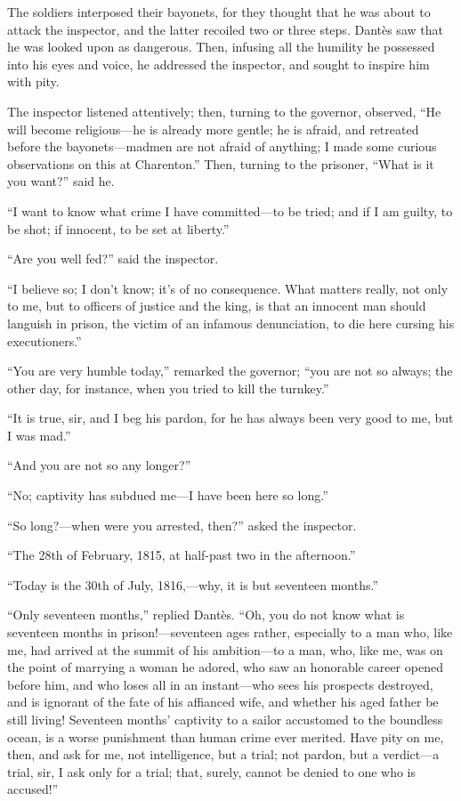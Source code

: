The soldiers interposed their bayonets, for they thought that he was
about to attack the inspector, and the latter recoiled two or three
steps. Dantès saw that he was looked upon as dangerous. Then, infusing
all the humility he possessed into his eyes and voice, he addressed the
inspector, and sought to inspire him with pity.

The inspector listened attentively; then, turning to the governor,
observed, “He will become religious—he is already more gentle; he is
afraid, and retreated before the bayonets—madmen are not afraid of
anything; I made some curious observations on this at Charenton.” Then,
turning to the prisoner, “What is it you want?” said he.

“I want to know what crime I have committed—to be tried; and if I am
guilty, to be shot; if innocent, to be set at liberty.”

“Are you well fed?” said the inspector.

“I believe so; I don’t know; it’s of no consequence. What matters
really, not only to me, but to officers of justice and the king, is
that an innocent man should languish in prison, the victim of an
infamous denunciation, to die here cursing his executioners.”

“You are very humble today,” remarked the governor; “you are not so
always; the other day, for instance, when you tried to kill the
turnkey.”

“It is true, sir, and I beg his pardon, for he has always been very
good to me, but I was mad.”

“And you are not so any longer?”

“No; captivity has subdued me—I have been here so long.”

“So long?—when were you arrested, then?” asked the inspector.

“The 28th of February, 1815, at half-past two in the afternoon.”

“Today is the 30th of July, 1816,—why, it is but seventeen months.”

“Only seventeen months,” replied Dantès. “Oh, you do not know what is
seventeen months in prison!—seventeen ages rather, especially to a man
who, like me, had arrived at the summit of his ambition—to a man, who,
like me, was on the point of marrying a woman he adored, who saw an
honorable career opened before him, and who loses all in an instant—who
sees his prospects destroyed, and is ignorant of the fate of his
affianced wife, and whether his aged father be still living! Seventeen
months’ captivity to a sailor accustomed to the boundless ocean, is a
worse punishment than human crime ever merited. Have pity on me, then,
and ask for me, not intelligence, but a trial; not pardon, but a
verdict—a trial, sir, I ask only for a trial; that, surely, cannot be
denied to one who is accused!”

